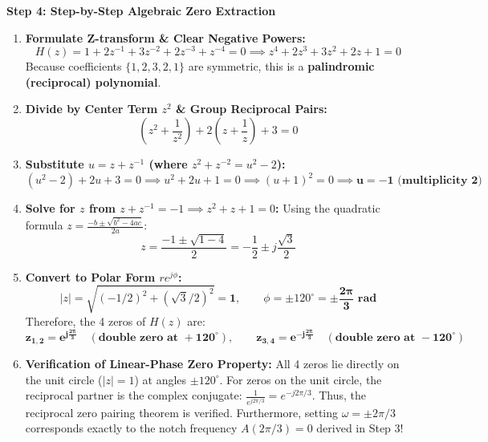 \documentclass[11pt,a4paper]{article}
\begin{document}
\vspace{1mm}
\noindent\textbf{Step 4: Step-by-Step Algebraic Zero Extraction}
\begin{enumerate}
    \item \textbf{Formulate Z-transform \& Clear Negative Powers:}
    \begin{equation}
    H(z) = 1 + 2z^{-1} + 3z^{-2} + 2z^{-3} + z^{-4} = 0 \implies z^4 + 2z^3 + 3z^2 + 2z + 1 = 0
    \end{equation}
    Because coefficients $\{1, 2, 3, 2, 1\}$ are symmetric, this is a \textbf{palindromic (reciprocal) polynomial}.
    
    \item \textbf{Divide by Center Term $z^2$ \& Group Reciprocal Pairs:}
    \begin{equation}
    \left(z^2 + \frac{1}{z^2}\right) + 2\left(z + \frac{1}{z}\right) + 3 = 0
    \end{equation}
    
    \item \textbf{Substitute $u = z + z^{-1}$ (where $z^2 + z^{-2} = u^2 - 2$):}
    \begin{equation}
    (u^2 - 2) + 2u + 3 = 0 \implies u^2 + 2u + 1 = 0 \implies (u + 1)^2 = 0 \implies \mathbf{u = -1 \text{ (multiplicity 2)}}
    \end{equation}
    
    \item \textbf{Solve for $z$ from $z + z^{-1} = -1 \implies z^2 + z + 1 = 0$:}
    Using the quadratic formula $z = \frac{-b \pm \sqrt{b^2 - 4ac}}{2a}$:
    \begin{equation}
    z = \frac{-1 \pm \sqrt{1 - 4}}{2} = -\frac{1}{2} \pm j \frac{\sqrt{3}}{2}
    \end{equation}
    
    \item \textbf{Convert to Polar Form $r e^{j\phi}$:}
    \begin{equation}
    |z| = \sqrt{(-1/2)^2 + (\sqrt{3}/2)^2} = \mathbf{1}, \qquad \phi = \pm 120^\circ = \mathbf{\pm \frac{2\pi}{3} \text{ rad}}
    \end{equation}
    Therefore, the 4 zeros of $H(z)$ are:
    \begin{equation}
    \mathbf{z_{1,2} = e^{j \frac{2\pi}{3}} \quad (\text{double zero at } +120^\circ), \qquad z_{3,4} = e^{-j \frac{2\pi}{3}} \quad (\text{double zero at } -120^\circ)}
    \end{equation}
    \item \textbf{Verification of Linear-Phase Zero Property:}
    All 4 zeros lie directly on the unit circle ($|z| = 1$) at angles $\pm 120^\circ$. For zeros on the unit circle, the reciprocal partner is the complex conjugate: $\frac{1}{e^{j 2\pi/3}} = e^{-j 2\pi/3}$. Thus, the reciprocal zero pairing theorem is verified. Furthermore, setting $\omega = \pm 2\pi/3$ corresponds exactly to the notch frequency $A(2\pi/3) = 0$ derived in Step 3!
\end{enumerate}
\end{document}
